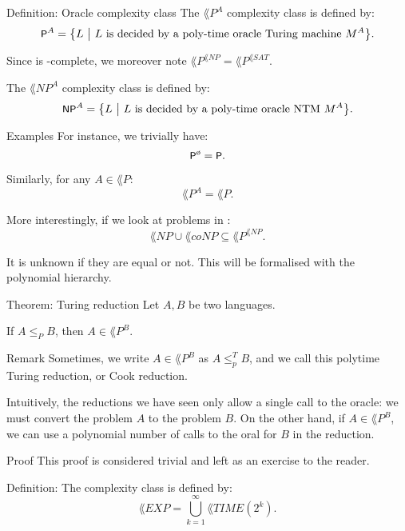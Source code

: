 \documentclass[a4paper]{article}
\begin{document}
\begin{parag}{Definition: Oracle complexity class}
    The $\lang{P}^A$ complexity class is defined by: 
    \[\lang{P}^A = \left\{L \suchthat L \text{ is decided by a poly-time oracle Turing machine $M^A$}\right\}.\]

    Since  is -complete, we moreover note $\lang{P}^{\lang{NP}} = \lang{P}^{\lang{SAT}}$.
    
    The $\lang{NP}^A$ complexity class is defined by: 
    \[\lang{NP}^A = \left\{L \suchthat L \text{ is decided by a poly-time oracle NTM $M^A$}\right\}.\]

    \begin{subparag}{Examples}
        For instance, we trivially have: 
        \[\lang{P}^\o = \lang{P}.\]

        Similarly, for any $A \in \lang{P}$: 
        \[\lang{P}^A = \lang{P}.\]

        More interestingly, if we look at problems in : 
        \[\lang{NP} \cup \lang{coNP} \subseteq \lang{P}^{\lang{NP}}.\]

        It is unknown if they are equal or not. This will be formalised with the polynomial hierarchy.
    \end{subparag}
\end{parag}

\begin{parag}{Theorem: Turing reduction}
    Let $A, B$ be two languages.

    If $A \leq_P B$, then $A \in \lang{P}^B$.

    \begin{subparag}{Remark}
        Sometimes, we write $A \in \lang{P}^B$ as $A \leq_p^T B$, and we call this polytime Turing reduction, or Cook reduction.

        Intuitively, the reductions we have seen only allow a single call to the oracle: we must convert the problem $A$ to the problem $B$. On the other hand, if $A \in \lang{P}^{B}$, we can use a polynomial number of calls to the oral for $B$ in the reduction.
    \end{subparag}

    \begin{subparag}{Proof}
        This proof is considered trivial and left as an exercise to the reader. \wink
    \end{subparag}
\end{parag}

\begin{parag}{Definition: }
    The  complexity class is defined by: 
    \[\lang{EXP} = \bigcup_{k=1}^{\infty} \lang{TIME}\left(2^k\right).\]
\end{parag}
    
\end{document}
